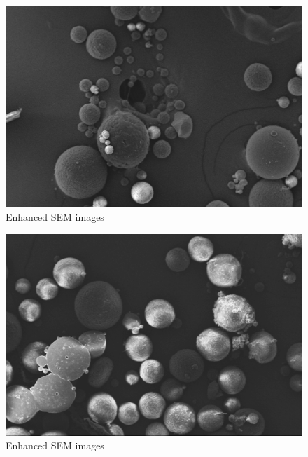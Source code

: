 \documentclass{article}
\begin{document}
                \begin{figure}[h!]
                    \centering 
                    \includegraphics[width=\textwidth]{Pictures/SEM/Edited/06_01.png}
                    \caption{Enhanced SEM images \autocites{Pixelmator_Pro}{GIMP}}
                    \label{fig:SEM_particles2}
                \end{figure}
            
                \begin{figure}[h!]
                    \centering 
                    \includegraphics[width=\textwidth]{Pictures/SEM/Edited/06_03.png}
                    \caption{Enhanced SEM images \autocites{Pixelmator_Pro}{GIMP}}
                    \label{fig:SEM_particles3}
                \end{figure}
            
\end{document}
